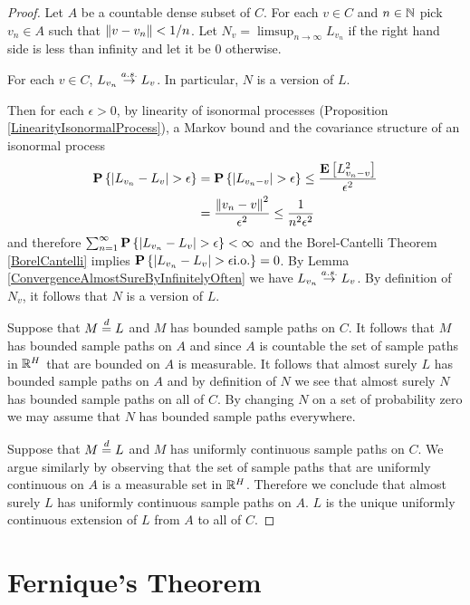 \begin{proof}
Let $A$ be a countable dense subset of $C$.  For each $v \in C$ and $n \in \mathbb{N}$ pick $v_n \in A$ such that $\left \lVert v - v_n \right \rVert < 1/n$.  Let $N_v = \limsup_{n \to \infty} L_{v_n}$ if the right hand side is less than infinity and let it be $0$ otherwise.

\begin{clm}For each $v \in C$, $L_{v_n} \overset{a.s.}\to L_v$.  In particular, $N$ is a version of $L$.
\end{clm}
Then for each $\epsilon > 0$, by linearity of isonormal processes (Proposition \ref{LinearityIsonormalProcess}), a Markov bound and the covariance structure of an isonormal process
\begin{align*}
\textbf{P}\left \{\left \vert L_{v_n} - L_v \right \vert > \epsilon \right \} &= \textbf{P}\left \{\left \vert L_{v_n - v} \right \vert > \epsilon \right \} \leq \frac{\textbf{E}\left[L^2_{v_n - v}\right]}{\epsilon^2} \\
&=\frac{\left \lVert v_n - v \right \rVert^2}{\epsilon^2} \leq \frac{1}{n^2 \epsilon^2}
\end{align*}
and therefore $\sum_{n = 1}^\infty \textbf{P}\left \{\left \vert L_{v_n} - L_v \right \vert > \epsilon  \right \}< \infty$ and the Borel-Cantelli Theorem \ref{BorelCantelli} implies $\textbf{P}\left \{\left \vert L_{v_n} - L_v \right \vert > \epsilon \text{i.o.} \right \} = 0$.  By Lemma \ref{ConvergenceAlmostSureByInfinitelyOften} we have $L_{v_n} \overset{a.s.}\to L_v$.  By definition of $N_v$, it follows that $N$ is a version of $L$.

Suppose that $M \overset{d}= L$ and $M$ has bounded sample paths on $C$.  It follows that $M$ has bounded sample paths on $A$ and since $A$ is countable the set of sample paths in $\mathbb{R}^H$ that are bounded on $A$ is measurable.  It follows that almost surely $L$ has bounded sample paths on $A$ and by definition of $N$ we see that almost surely $N$ has bounded sample paths on all of $C$.  By changing $N$ on a set of probability zero we may assume that $N$ has bounded sample paths everywhere.

Suppose that $M \overset{d}= L$ and $M$ has uniformly continuous sample paths on $C$.  We argue similarly by observing that the set of sample paths that are uniformly continuous on $A$ is a measurable set in $\mathbb{R}^H$.  Therefore we conclude that almost surely $L$ has uniformly continuous sample paths on $A$.  $L$ is the unique uniformly continuous extension of $L$ from $A$ to all of $C$.
\end{proof}

\section{Fernique's Theorem}

